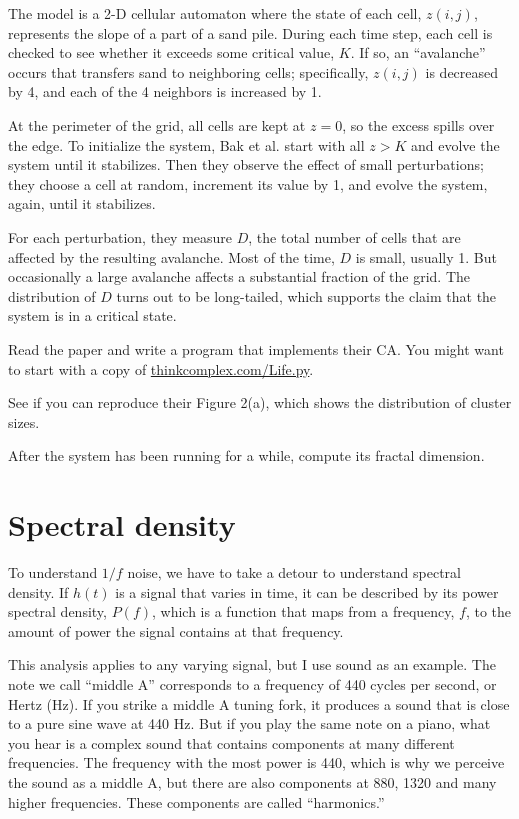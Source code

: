 \documentclass[10pt]{book}
\begin{document}
The model is a 2-D cellular automaton where the state of each cell,
$z(i,j)$, represents the slope of a part of a sand pile.  During each
time step, each cell is checked to see whether it exceeds some
critical value, $K$.  If so, an ``avalanche'' occurs that transfers
sand to neighboring cells; specifically, $z(i,j)$ is decreased by 4,
and each of the 4 neighbors is increased by 1.

At the perimeter of the grid, all cells are kept at $z=0$, so
the excess spills over the edge.  To initialize the system,
Bak et al. start with all $z > K$ and evolve the system until
it stabilizes.  Then they observe the effect of small perturbations;
they choose a cell at random, increment its value
by 1, and evolve the system, again, until it stabilizes.

For each perturbation, they measure $D$, the total number
of cells that are affected by the resulting avalanche.  Most of
the time, $D$ is small, usually 1.  But occasionally
a large avalanche affects a substantial fraction
of the grid.  The distribution of $D$ turns out to be long-tailed,
which supports the claim that the system is in a critical state.

\begin{exercise}

Read the paper and write a program that implements their CA.
You might want to start with a copy of
\url{thinkcomplex.com/Life.py}.

See if you can reproduce their Figure 2(a), which shows the
distribution of cluster sizes.

After the system has been running for a while, compute its
fractal dimension.

\end{exercise}


\section{Spectral density}

To understand $1/f$ noise, we have to take a detour to understand
spectral density.  If $h(t)$ is a signal that varies in time, it can
be described by its power spectral density, $P(f)$, which is a
function that maps from a frequency, $f$, to the amount of power the
signal contains at that frequency.

This analysis applies to any varying signal, but I use sound as
an example.  The note we call ``middle A'' corresponds to a frequency
of 440 cycles per second, or Hertz (Hz).  If you strike a middle A
tuning fork, it produces a sound that is close to a pure sine wave at
440 Hz.  But if you play the same note on a piano, what you hear is
a complex sound that contains components at many different
frequencies.  The frequency with the most power is 440, which is why
we perceive the sound as a middle A, but there are also components at
880, 1320 and many higher frequencies.  These components are called
``harmonics.''
\end{document}
